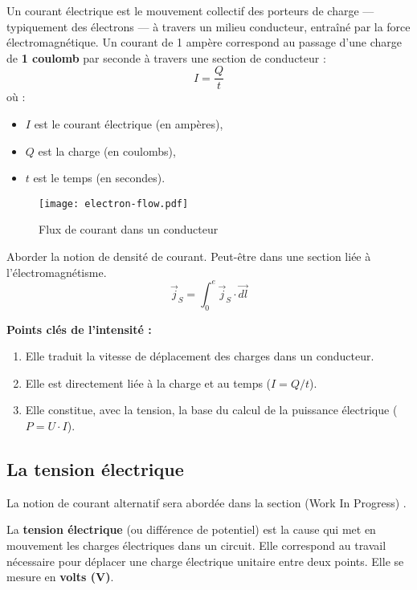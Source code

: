 Un courant \'electrique est le mouvement collectif des porteurs de charge —
typiquement des \'electrons — à travers un milieu conducteur, entraîn\'e par
la force \'electromagn\'etique.
Un courant de 1 amp\`ere correspond au passage d’une charge de \textbf{1 coulomb}
par seconde à travers une section de conducteur :
\[
  I = \frac{Q}{t}
\]
où :
\begin{itemize}
  \item \(I\) est le courant \'electrique (en amp\`eres),
  \item \(Q\) est la charge (en coulombs),
  \item \(t\) est le temps (en secondes).
\end{itemize}

\begin{figure}[H]
    \texttt{[image: electron-flow.pdf]}
    \caption{Flux de courant dans un conducteur}
\end{figure}
\begin{Todo}
	Aborder la notion de densit\'e de courant. Peut-\^etre dans une section li\'ee \`a l'\'electromagn\'etisme.
	\[
	\vec{j}_S=\int_0^e\vec{j}_S\cdot\vec{dl}
	\]
\end{Todo}

\begin{Note}
\vspace{\baselineskip}
\textbf{Points cl\'es de l’intensit\'e :}
\begin{enumerate}
  \item Elle traduit la vitesse de d\'eplacement des charges dans un conducteur.
  \item Elle est directement li\'ee à la charge et au temps (\(I = Q/t\)).
  \item Elle constitue, avec la tension, la base du calcul de la puissance \'electrique (\(P = U \cdot I\)).
\end{enumerate}
\end{Note}

\subsection{La tension \'electrique}
\begin{Note}
	La notion de courant alternatif sera abord\'ee dans la section (Work In Progress) .
\end{Note}

La \textbf{tension \'electrique} (ou diff\'erence de potentiel) est la cause
qui met en mouvement les charges \'electriques dans un circuit. Elle
correspond au travail n\'ecessaire pour d\'eplacer une charge \'electrique
unitaire entre deux points. Elle se mesure en \textbf{volts
(\unit{\volt})}.

